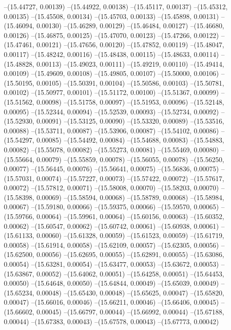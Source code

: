 --(15.44727, 0.00139)
--(15.44922, 0.00138)
--(15.45117, 0.00137)
--(15.45312, 0.00135)
--(15.45508, 0.00134)
--(15.45703, 0.00133)
--(15.45898, 0.00131)
--(15.46094, 0.00130)
--(15.46289, 0.00129)
--(15.46484, 0.00127)
--(15.46680, 0.00126)
--(15.46875, 0.00125)
--(15.47070, 0.00123)
--(15.47266, 0.00122)
--(15.47461, 0.00121)
--(15.47656, 0.00120)
--(15.47852, 0.00119)
--(15.48047, 0.00117)
--(15.48242, 0.00116)
--(15.48438, 0.00115)
--(15.48633, 0.00114)
--(15.48828, 0.00113)
--(15.49023, 0.00111)
--(15.49219, 0.00110)
--(15.49414, 0.00109)
--(15.49609, 0.00108)
--(15.49805, 0.00107)
--(15.50000, 0.00106)
--(15.50195, 0.00105)
--(15.50391, 0.00104)
--(15.50586, 0.00103)
--(15.50781, 0.00102)
--(15.50977, 0.00101)
--(15.51172, 0.00100)
--(15.51367, 0.00099)
--(15.51562, 0.00098)
--(15.51758, 0.00097)
--(15.51953, 0.00096)
--(15.52148, 0.00095)
--(15.52344, 0.00094)
--(15.52539, 0.00093)
--(15.52734, 0.00092)
--(15.52930, 0.00091)
--(15.53125, 0.00090)
--(15.53320, 0.00089)
--(15.53516, 0.00088)
--(15.53711, 0.00087)
--(15.53906, 0.00087)
--(15.54102, 0.00086)
--(15.54297, 0.00085)
--(15.54492, 0.00084)
--(15.54688, 0.00083)
--(15.54883, 0.00082)
--(15.55078, 0.00082)
--(15.55273, 0.00081)
--(15.55469, 0.00080)
--(15.55664, 0.00079)
--(15.55859, 0.00078)
--(15.56055, 0.00078)
--(15.56250, 0.00077)
--(15.56445, 0.00076)
--(15.56641, 0.00075)
--(15.56836, 0.00075)
--(15.57031, 0.00074)
--(15.57227, 0.00073)
--(15.57422, 0.00072)
--(15.57617, 0.00072)
--(15.57812, 0.00071)
--(15.58008, 0.00070)
--(15.58203, 0.00070)
--(15.58398, 0.00069)
--(15.58594, 0.00068)
--(15.58789, 0.00068)
--(15.58984, 0.00067)
--(15.59180, 0.00066)
--(15.59375, 0.00066)
--(15.59570, 0.00065)
--(15.59766, 0.00064)
--(15.59961, 0.00064)
--(15.60156, 0.00063)
--(15.60352, 0.00062)
--(15.60547, 0.00062)
--(15.60742, 0.00061)
--(15.60938, 0.00061)
--(15.61133, 0.00060)
--(15.61328, 0.00059)
--(15.61523, 0.00059)
--(15.61719, 0.00058)
--(15.61914, 0.00058)
--(15.62109, 0.00057)
--(15.62305, 0.00056)
--(15.62500, 0.00056)
--(15.62695, 0.00055)
--(15.62891, 0.00055)
--(15.63086, 0.00054)
--(15.63281, 0.00054)
--(15.63477, 0.00053)
--(15.63672, 0.00053)
--(15.63867, 0.00052)
--(15.64062, 0.00051)
--(15.64258, 0.00051)
--(15.64453, 0.00050)
--(15.64648, 0.00050)
--(15.64844, 0.00049)
--(15.65039, 0.00049)
--(15.65234, 0.00048)
--(15.65430, 0.00048)
--(15.65625, 0.00047)
--(15.65820, 0.00047)
--(15.66016, 0.00046)
--(15.66211, 0.00046)
--(15.66406, 0.00045)
--(15.66602, 0.00045)
--(15.66797, 0.00044)
--(15.66992, 0.00044)
--(15.67188, 0.00044)
--(15.67383, 0.00043)
--(15.67578, 0.00043)
--(15.67773, 0.00042)
